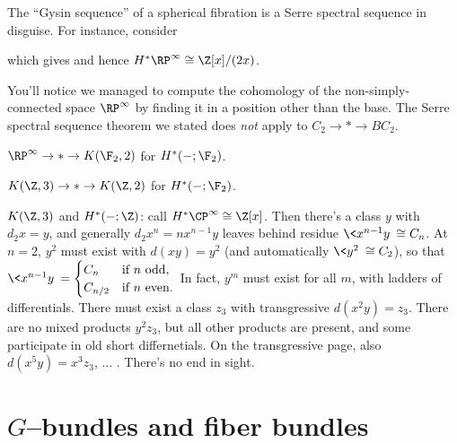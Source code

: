 \begin{example}
The ``Gysin sequence'' of a spherical fibration is a Serre spectral sequence in disguise.  For instance, consider
\begin{center}
\end{center}
which gives
and hence $H^* \RP^\infty \cong \Z[x]/(2x)$.
\end{example}

\begin{remark}
You'll notice we managed to compute the cohomology of the non-simply-connected space $\RP^\infty$ by finding it in a position other than the base.  The Serre spectral sequence theorem we stated does \emph{not} apply to $C_2 \to * \to BC_2$.
\end{remark}

\begin{example}
$\RP^\infty \to * \to K(\F_2, 2)$ for $H^*(-; \F_2)$.
\end{example}

\begin{example}
$K(\Z, 3) \to * \to K(\Z, 2)$ for $H^*(-; \F_2)$.
\end{example}

\begin{example}
$K(\Z, 3)$ and $H^*(-; \Z)$: call $H^*\CP^\infty \cong \Z[x]$.  Then there's a class $y$ with $d_2 x = y$, and generally $d_2 x^n = n x^{n-1} y$ leaves behind residue $\<x^{n-1} y\> \cong C_n$.  At $n = 2$, $y^2$ must exist with $d(xy) = y^2$ (and automatically $\<y^2\> \cong C_2$), so that $\<x^{n-1} y\> = \begin{cases} C_n & \text{if $n$ odd}, \\ C_{n/2} & \text{if $n$ even}.\end{cases}$  In fact, $y^m$ must exist for all $m$, with ladders of differentials.  There must exist a class $z_3$ with transgressive $d(x^2 y) = z_3$.  There are no mixed products $y^2 z_3$, but all other products are present, and some participate in old short differnetials.  On the transgressive page, also $d(x^5 y) = x^3 z_3$, ... . There's no end in sight.
\end{example}




\section{$G$--bundles and fiber bundles}

